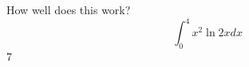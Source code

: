 \documentclass{article}
\begin{document}
How well does this work?
$$\int_0^4 x^2 \ln{2x}dx$$
7
\end{document}
